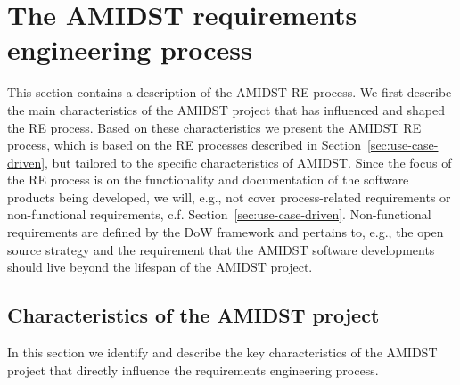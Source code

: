 \section{The AMIDST requirements engineering process}
\label{sec:AmidstRequirementProcess}

This section contains a description of the AMIDST RE process.  We first describe the main characteristics of the AMIDST project that
has influenced and shaped the RE process. Based on these characteristics we present the
AMIDST RE process, which is based on the RE processes described in
Section~\ref{sec:use-case-driven}, but tailored to the specific characteristics of AMIDST. Since the focus of the RE process
is on the functionality and documentation of the software products being developed, we will, e.g., not cover
process-related requirements or non-functional requirements, c.f. Section~\ref{sec:use-case-driven}. Non-functional
requirements are defined by the DoW framework and pertains to, e.g., the open source strategy and the requirement that
the AMIDST software developments should live beyond the lifespan of the AMIDST project.





\subsection{Characteristics of the AMIDST project}
\label{sec:characteristics}

In this section we identify and describe the key characteristics of the AMIDST project that directly influence the requirements
engineering process. 


